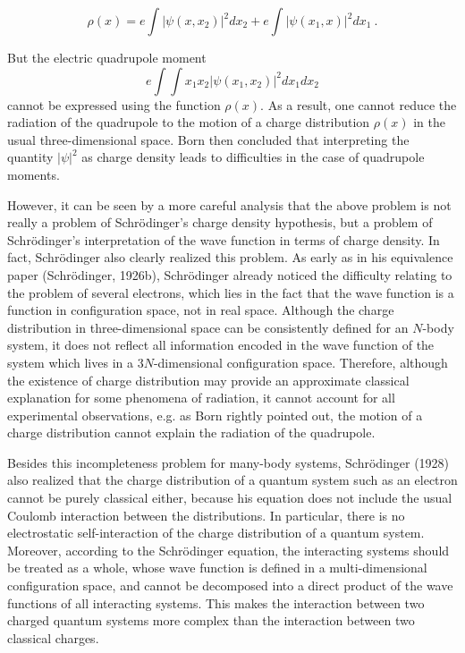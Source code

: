 \begin{equation}
    \rho(x)=e\int|\psi(x,x_2)|^2dx_2+e\int|\psi(x_1,x)|^2dx_1\ .
\end{equation}

\noindent But the electric quadrupole moment
  \[
    e\int\!\int x_1x_2|\psi(x_1,x_2)|^2dx_1dx_2
  \]
cannot be expressed using the function $\rho(x)$. As a result, one cannot reduce the radiation of the quadrupole to the motion of a charge distribution $\rho(x)$ in the usual three-dimensional space. Born then concluded that interpreting the quantity $|\psi|^2$ as charge density leads to difficulties in the case of quadrupole moments.

However, it can be seen by a more careful analysis that the above problem is not really a problem of Schr\"{o}dinger's charge density hypothesis, but a problem of Schr\"{o}dinger's interpretation of the wave function in terms of charge density. In fact, Schr\"{o}dinger also clearly realized this problem. As early as in his equivalence paper (Schr\"{o}dinger, 1926b), Schr\"{o}dinger already noticed the difficulty relating to the problem of several electrons, which lies in the fact that the wave function is a function in configuration space, not in real space. Although the charge distribution in three-dimensional space can be consistently defined for an $N$-body system, it does not reflect all information encoded in the wave function of the system which lives in a $3N$-dimensional configuration space. Therefore, although the existence of charge distribution may provide an approximate classical explanation for some phenomena of radiation, it cannot account for all experimental observations, e.g. as Born rightly pointed out, the motion of a charge distribution cannot explain the radiation of the quadrupole.

Besides this incompleteness problem for many-body systems, Schr\"{o}dinger (1928) also realized that the charge distribution of a quantum system such as an electron cannot be purely classical either, because his equation does not include the usual Coulomb interaction between the distributions. In particular, there is no electrostatic self-interaction of the charge distribution of a quantum system. Moreover, according to the Schr\"{o}dinger equation, the interacting systems should be treated as a whole, whose wave function is defined in a multi-dimensional configuration space, and cannot be decomposed into a direct product of the wave functions of all interacting systems. This makes the interaction between two charged quantum systems more complex than the interaction between two classical charges.

